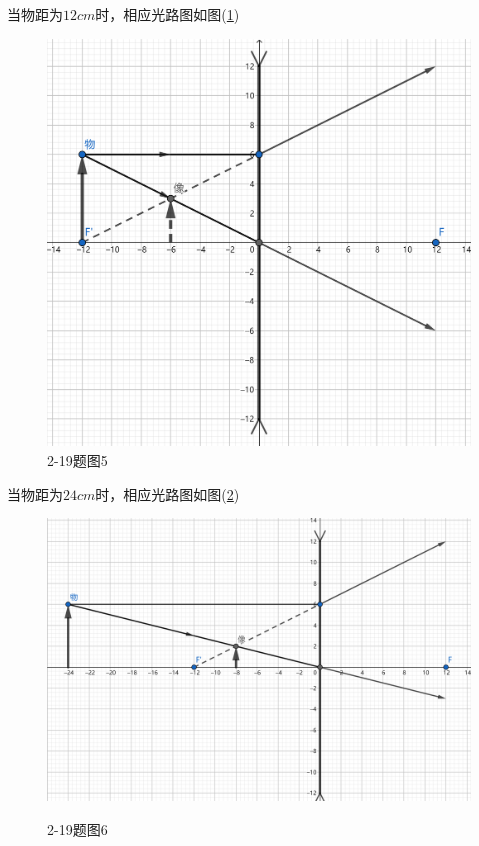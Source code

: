 \documentclass[10pt,a4paper]{article}
\theoremstyle{remark}
\begin{document}
当物距为$12cm$时，相应光路图如图(\ref{FigureofProblem2-19_5})
\begin{figure}
\centering
\includegraphics[scale=.2]{OpticsHomework_2_2-19_5(tailored).png}
\caption{2-19题图5}\label{FigureofProblem2-19_5}
\end{figure}

当物距为$24cm$时，相应光路图如图(\ref{FigureofProblem2-19_6})
\begin{figure}
\centering
\includegraphics[scale=.18]{OpticsHomework_2_2-19_6(tailored).png}\\
\caption{2-19题图6}\label{FigureofProblem2-19_6}
\end{figure}
\end{document}
